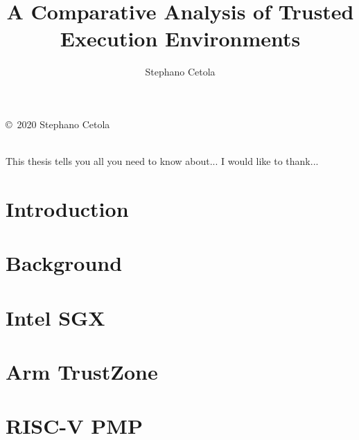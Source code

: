 \documentclass[12pt,oneside,letterpaper]{PSUreport}
\begin{document}
\title{A Comparative Analysis of Trusted Execution Environments}
\subtitle{}
\author{Stephano Cetola}
\submitdate{\today}

\copyrightfalse
\figurespagetrue
\tablespagetrue
\null\vfill
\begin{center}
        \copyright\ 2020 Stephano Cetola \\
        \doclicenseLongText \\
        \vspace{5 mm}
        \doclicenseImage
\end{center}
\vfill\newpage
 
\beforepreface
{}
This thesis tells you all you need to know about...
I would like to thank...
\afterpreface

\printnoidxglossary[type=\acronymtype]



\glsresetall
\chapter{Introduction}
\label{chap:intro}


\glsresetall
\chapter{Background}
\label{chap:bg}


\glsresetall
\chapter{Intel SGX}
\label{chap:sgx}


\glsresetall
\chapter{Arm TrustZone}
\label{chap:trustzone}


\glsresetall
\chapter{RISC-V PMP}
\label{chap:pmp}

\end{document}
